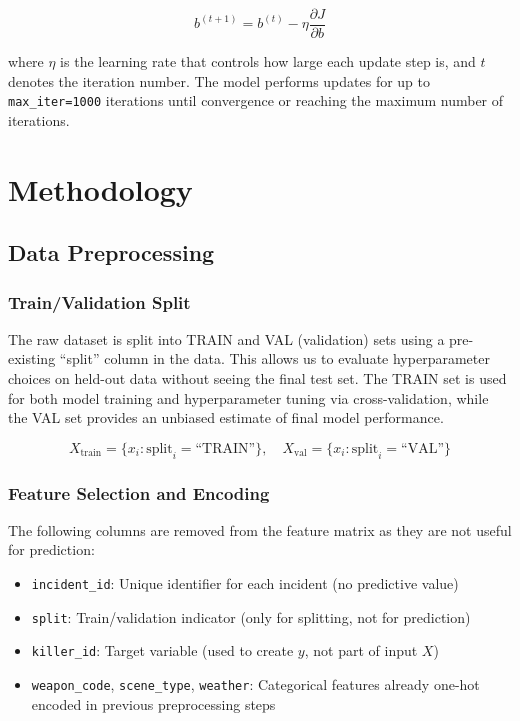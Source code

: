 \documentclass[12pt]{article}
\begin{document}
\begin{equation}
b^{(t+1)} = b^{(t)} - \eta \frac{\partial J}{\partial b}
\end{equation}

where $\eta$ is the learning rate that controls how large each update step is, and $t$ denotes the iteration number. The model performs updates for up to \texttt{max\_iter=1000} iterations until convergence or reaching the maximum number of iterations.

\section{Methodology}

\subsection{Data Preprocessing}

\subsubsection{Train/Validation Split}

The raw dataset is split into TRAIN and VAL (validation) sets using a pre-existing ``split'' column in the data. This allows us to evaluate hyperparameter choices on held-out data without seeing the final test set. The TRAIN set is used for both model training and hyperparameter tuning via cross-validation, while the VAL set provides an unbiased estimate of final model performance.

\begin{equation}
X_{\text{train}} = \{x_i : \text{split}_i = \text{``TRAIN''}\}, \quad X_{\text{val}} = \{x_i : \text{split}_i = \text{``VAL''}\}
\end{equation}

\subsubsection{Feature Selection and Encoding}

The following columns are removed from the feature matrix as they are not useful for prediction:
\begin{itemize}
    \item \texttt{incident\_id}: Unique identifier for each incident (no predictive value)
    \item \texttt{split}: Train/validation indicator (only for splitting, not for prediction)
    \item \texttt{killer\_id}: Target variable (used to create $y$, not part of input $X$)
    \item \texttt{weapon\_code}, \texttt{scene\_type}, \texttt{weather}: Categorical features already one-hot encoded in previous preprocessing steps
\end{itemize}
\end{document}
